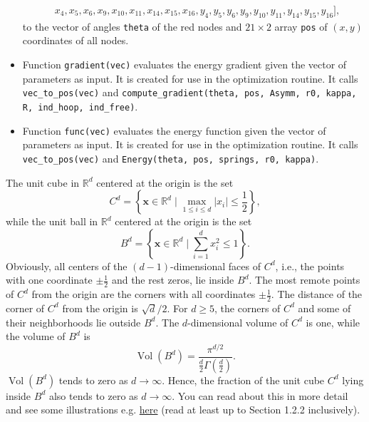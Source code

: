 \documentclass{../kin_math}
\begin{document}
\begin{questions}
\begin{itemize}
\begin{align*}
                       &x_4, x_5, x_6, x_9, x_{10}, x_{11}, x_{14}, x_{15}, x_{16}, y_4, y_5, y_6, y_9, y_{10}, y_{11}, y_{14}, y_{15}, y_{16} ],
    \end{align*}
    to the vector of angles \texttt{theta} of the red nodes and $21 \times 2$ array \texttt{pos} of $(x, y)$ coordinates of all nodes.
    \item Function \texttt{gradient(vec)} evaluates the energy gradient given the vector of parameters as input. It is created for use in the optimization routine. It calls \texttt{vec\_to\_pos(vec)} and \texttt{compute\_gradient(theta, pos, Asymm, r0, kappa, R, ind\_hoop, ind\_free)}.
    \item Function \texttt{func(vec)} evaluates the energy function given the vector of parameters as input. It is created for use in the optimization routine. It calls \texttt{vec\_to\_pos(vec)} and \texttt{Energy(theta, pos, springs, r0, kappa)}.
  \end{itemize}

  \question The unit cube in $\mathbb{R}^d$ centered at the origin is the set
  \begin{equation}
    C^d = \left\{ \textbf{x} \in \mathbb{R}^d \mid \max_{1 \leq i \leq d} |x_i| \leq \frac{1}{2} \right\},
  \end{equation}
  while the unit ball in $\mathbb{R}^d$ centered at the origin is the set
  \begin{equation}
    B^d = \left\{ \textbf{x} \in \mathbb{R}^d \mid \sum_{i = 1}^d x_i^2 \leq 1 \right\}.
  \end{equation}
  Obviously, all centers of the $(d - 1)$-dimensional faces of $C^d$, i.e., the points with one
  coordinate $\pm \frac{1}{2}$ and the rest zeros, lie inside $B^d$. The most remote points of $C^d$ from the origin are the corners with all coordinates $\pm \frac{1}{2}$. The distance of the corner of $C^d$ from the origin is $\sqrt{d} / 2$. For $d \geq 5$, the corners of $C^d$ and some of their neighborhoods lie outside $B^d$. The $d$-dimensional volume of $C^d$ is one, while the volume of $B^d$ is
  \begin{equation}
    \operatorname{Vol}\left(B^d\right) = \dfrac{\pi^{d / 2}}{\frac{d}{2} \Gamma\left(\frac{d}{2}\right)}.
  \end{equation}
  $\operatorname{Vol}\left(B^d\right)$ tends to zero as $d \to \infty$. Hence, the fraction of the unit cube $C^d$ lying inside $B^d$ also tends to zero as $d \to \infty$. You can read about this in more detail and see some illustrations e.g. \href{https://www.cs.cmu.edu/~venkatg/teaching/CStheory-infoage/chap1-high-dim-space.pdf}{here} (read at least up to Section 1.2.2 inclusively).


\end{questions}
\end{document}
